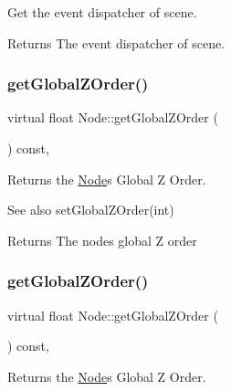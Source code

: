 Get the event dispatcher of scene.

\begin{DoxyReturn}{Returns}
The event dispatcher of scene. 
\end{DoxyReturn}
\mbox{\label{classNode_afa5a7920169dbe5f21a59029bb04c166}} 
\subsubsection{\texorpdfstring{get\+Global\+Z\+Order()}{getGlobalZOrder()}\hspace{0.1cm}{\footnotesize\ttfamily [1/2]}}
{\footnotesize\ttfamily virtual float Node\+::get\+Global\+Z\+Order (\begin{DoxyParamCaption}{ }\end{DoxyParamCaption}) const\hspace{0.3cm}{\ttfamily [inline]}, {\ttfamily [virtual]}}

Returns the \hyperlink{classNode}{Node}\textquotesingle{}s Global Z Order.

\begin{DoxySeeAlso}{See also}
{\ttfamily set\+Global\+Z\+Order(int)}
\end{DoxySeeAlso}
\begin{DoxyReturn}{Returns}
The node\textquotesingle{}s global Z order 
\end{DoxyReturn}
\mbox{\label{classNode_afa5a7920169dbe5f21a59029bb04c166}} 
\subsubsection{\texorpdfstring{get\+Global\+Z\+Order()}{getGlobalZOrder()}\hspace{0.1cm}{\footnotesize\ttfamily [2/2]}}
{\footnotesize\ttfamily virtual float Node\+::get\+Global\+Z\+Order (\begin{DoxyParamCaption}{ }\end{DoxyParamCaption}) const\hspace{0.3cm}{\ttfamily [inline]}, {\ttfamily [virtual]}}

Returns the \hyperlink{classNode}{Node}\textquotesingle{}s Global Z Order.

